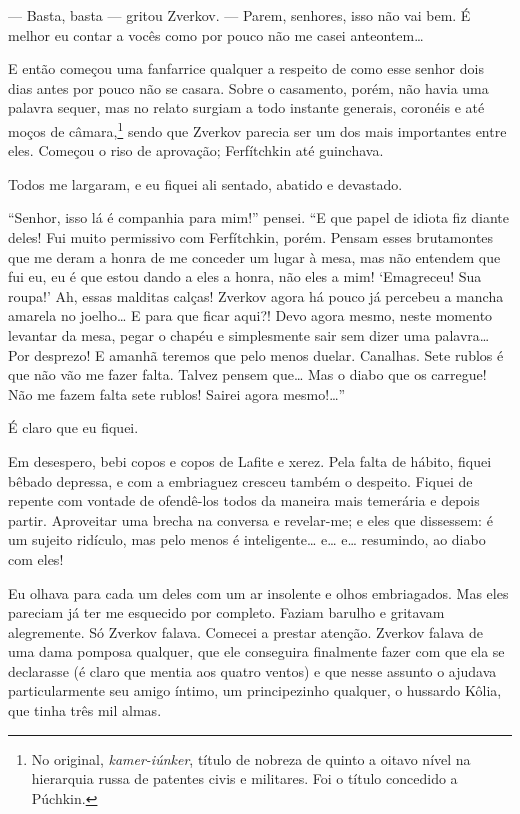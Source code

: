 --- Basta, basta --- gritou Zverkov. --- Parem, senhores, isso não vai bem. É
melhor eu contar a vocês como por pouco não me casei anteontem\ldots{}

E então começou uma fanfarrice qualquer a respeito de como esse senhor
dois dias antes por pouco não se casara. Sobre o casamento, porém, não
havia uma palavra sequer, mas no relato surgiam a todo instante
generais, coronéis e até moços de câmara,\footnote{ No original,
\textit{kamer-iúnker}, título de nobreza de quinto a oitavo nível na
hierarquia russa de patentes civis e militares. Foi o título concedido a
Púchkin.} sendo que Zverkov parecia ser um dos mais importantes entre
eles. Começou o riso de aprovação; Ferfítchkin até guinchava.

Todos me largaram, e eu fiquei ali sentado, abatido e devastado.

“Senhor, isso lá é companhia para mim!” pensei. “E que papel de idiota
fiz diante deles! Fui muito permissivo com Ferfítchkin, porém. Pensam
esses brutamontes que me deram a honra de me conceder um lugar à mesa,
mas não entendem que fui eu, eu é que estou dando a eles a honra, não
eles a mim! ‘Emagreceu! Sua roupa!’ Ah, essas malditas calças! Zverkov
agora há pouco já percebeu a mancha amarela no joelho\ldots{} E para que
ficar aqui?! Devo agora mesmo, neste momento levantar da mesa, pegar o
chapéu e simplesmente sair sem dizer uma palavra\ldots{} Por desprezo! E
amanhã teremos que pelo menos duelar. Canalhas. Sete rublos é que não
vão me fazer falta. Talvez pensem que\ldots{} Mas o diabo que os carregue!
Não me fazem falta sete rublos! Sairei agora mesmo!\ldots{}”

É claro que eu fiquei.

Em desespero, bebi copos e copos de Lafite e xerez. Pela falta de
hábito, fiquei bêbado depressa, e com a embriaguez cresceu também o
despeito. Fiquei de repente com vontade de ofendê-los todos da maneira
mais temerária e depois partir. Aproveitar uma brecha na conversa e
revelar-me; e eles que dissessem: é um sujeito ridículo, mas pelo menos
é inteligente\ldots{} e\ldots{} e\ldots{} resumindo, ao diabo com eles!

Eu olhava para cada um deles com um ar insolente e olhos embriagados.
Mas eles pareciam já ter me esquecido por completo. Faziam barulho e
gritavam alegremente. Só Zverkov falava. Comecei a prestar atenção.
Zverkov falava de uma dama pomposa qualquer, que ele conseguira
finalmente fazer com que ela se declarasse (é claro que mentia aos
quatro ventos) e que nesse assunto o ajudava particularmente seu amigo
íntimo, um principezinho qualquer, o hussardo Kôlia, que tinha três mil
almas.

